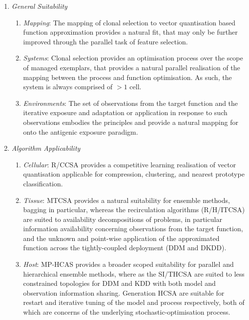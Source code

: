 \begin{enumerate}
	\item \emph{General Suitability}
	\begin{enumerate}
		\item \emph{Mapping}: The mapping of clonal selection to vector quantisation based function approximation provides a natural fit, that may only be further improved through the parallel task of feature selection. 
		\item \emph{Systems}: Clonal selection provides an optimisation process over the scope of managed exemplars, that provides a natural parallel realisation of the mapping between the process and function optimisation. As such, the system is always comprised of $>1$ cell.
		\item \emph{Environments}: The set of observations from the target function and the iterative exposure and adaptation or application in response to such observations embodies the principles and provide a natural mapping for onto the antigenic exposure paradigm.
	\end{enumerate}
	
	\item \emph{Algorithm Applicability}
	\begin{enumerate}
		\item \emph{Cellular}: R/CCSA provides a competitive learning realisation of vector quantisation applicable for compression, clustering, and nearest prototype classification. 
		\item \emph{Tissue}: MTCSA provides a natural suitability for ensemble methods, bagging in particular, whereas the recirculation algorithms (R/H/ITCSA) are suited to availability decompositions of problems, in particular information availability concerning observations from the target function, and the unknown and point-wise application of the approximated function across the tightly-coupled deployment (DDM and DKDD).
		\item \emph{Host}: MP-HCAS provides a broader scoped suitability for parallel and hierarchical ensemble methods, where as the SI/THCSA are suited to less constrained topologies for DDM and KDD with both model and observation information sharing. Generation HCSA are suitable for restart and iterative tuning of the model and process respectively, both of which are concerns of the underlying stochastic-optimisation process. 
	\end{enumerate}		
	
\end{enumerate}



